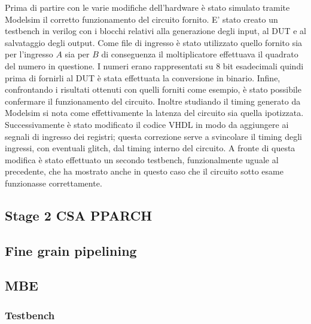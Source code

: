Prima di partire con le varie modifiche dell'hardware è stato simulato tramite Modelsim il corretto funzionamento del circuito fornito. E' stato creato un testbench in verilog con i blocchi relativi alla generazione degli input, al DUT e al salvataggio degli output.
Come file di ingresso è stato utilizzato quello fornito sia per l'ingresso $A$ sia per $B$ di conseguenza il moltiplicatore effettuava il quadrato del numero in questione. I numeri erano rappresentati su 8 bit esadecimali quindi prima di fornirli al DUT è stata effettuata la conversione in binario.
Infine, confrontando i risultati ottenuti con quelli forniti come esempio, è stato possibile confermare il funzionamento del circuito. Inoltre studiando il timing generato da Modelsim si nota come effettivamente la latenza del circuito sia quella ipotizzata.
\\
Successivamente è stato modificato il codice VHDL in modo da aggiungere ai segnali di ingresso dei registri; questa correzione serve a svincolare il timing degli ingressi, con eventuali glitch, dal timing interno del circuito.
A fronte di questa modifica è stato effettuato un secondo testbench, funzionalmente uguale al precedente, che ha mostrato anche in questo caso che il circuito sotto esame funzionasse correttamente.

\subsection{Stage 2 CSA PPARCH}

\subsection{Fine grain pipelining}

\subsection{MBE}
\subsubsection{Testbench}
